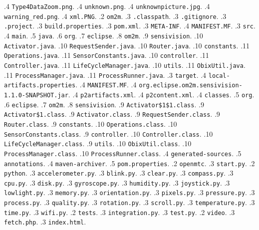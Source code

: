 {.4 \lstinline{Type4DataZoom.png}.
.4 \lstinline{unknown.png}.
.4 \lstinline{unknownpicture.jpg}.
.4 \lstinline{warning_red.png}.
.4 \lstinline{xml.PNG}.
.2 \lstinline{om2m}.
.3 \lstinline{.classpath}.
.3 \lstinline{.gitignore}.
.3 \lstinline{.project}.
.3 \lstinline{build.properties}.
.3 \lstinline{pom.xml}.
.3 \lstinline{META-INF}.
.4 \lstinline{MANIFEST.MF}.
.3 \lstinline{src}.
.4 \lstinline{main}.
.5 \lstinline{java}.
.6 \lstinline{org}.
.7 \lstinline{eclipse}.
.8 \lstinline{om2m}.
.9 \lstinline{sensivision}.
.10 \lstinline{Activator.java}.
.10 \lstinline{RequestSender.java}.
.10 \lstinline{Router.java}.
.10 \lstinline{constants}.
.11 \lstinline{Operations.java}.
.11 \lstinline{SensorConstants.java}.
.10 \lstinline{controller}.
.11 \lstinline{Controller.java}.
.11 \lstinline{LifeCycleManager.java}.
.10 \lstinline{utils}.
.11 \lstinline{ObixUtil.java}.
.11 \lstinline{ProcessManager.java}.
.11 \lstinline{ProcessRunner.java}.
.3 \lstinline{target}.
.4 \lstinline{local-artifacts.properties}.
.4 \lstinline{MANIFEST.MF}.
.4 \lstinline{org.eclipse.om2m.sensivision-1.1.0-SNAPSHOT.jar}.
.4 \lstinline{p2artifacts.xml}.
.4 \lstinline{p2content.xml}.
.4 \lstinline{classes}.
.5 \lstinline{org}.
.6 \lstinline{eclipse}.
.7 \lstinline{om2m}.
.8 \lstinline{sensivision}.
.9 \lstinline{Activator$1$1.class}.
.9 \lstinline{Activator$1.class}.
.9 \lstinline{Activator.class}.
.9 \lstinline{RequestSender.class}.
.9 \lstinline{Router.class}.
.9 \lstinline{constants}.
.10 \lstinline{Operations.class}.
.10 \lstinline{SensorConstants.class}.
.9 \lstinline{controller}.
.10 \lstinline{Controller.class}.
.10 \lstinline{LifeCycleManager.class}.
.9 \lstinline{utils}.
.10 \lstinline{ObixUtil.class}.
.10 \lstinline{ProcessManager.class}.
.10 \lstinline{ProcessRunner.class}.
.4 \lstinline{generated-sources}.
.5 \lstinline{annotations}.
.4 \lstinline{maven-archiver}.
.5 \lstinline{pom.properties}.
.2 \lstinline{openmtc}.
.3 \lstinline{start.py}.
.2 \lstinline{python}.
.3 \lstinline{accelerometer.py}.
.3 \lstinline{blink.py}.
.3 \lstinline{clear.py}.
.3 \lstinline{compass.py}.
.3 \lstinline{cpu.py}.
.3 \lstinline{disk.py}.
.3 \lstinline{gyroscope.py}.
.3 \lstinline{humidity.py}.
.3 \lstinline{joystick.py}.
.3 \lstinline{lowlight.py}.
.3 \lstinline{memory.py}.
.3 \lstinline{orientation.py}.
.3 \lstinline{pixels.py}.
.3 \lstinline{pressure.py}.
.3 \lstinline{process.py}.
.3 \lstinline{quality.py}.
.3 \lstinline{rotation.py}.
.3 \lstinline{scroll.py}.
.3 \lstinline{temperature.py}.
.3 \lstinline{time.py}.
.3 \lstinline{wifi.py}.
.2 \lstinline{tests}.
.3 \lstinline{integration.py}.
.3 \lstinline{test.py}.
.2 \lstinline{video}.
.3 \lstinline{fetch.php}.
.3 \lstinline{index.html}.
}

\clearpage
